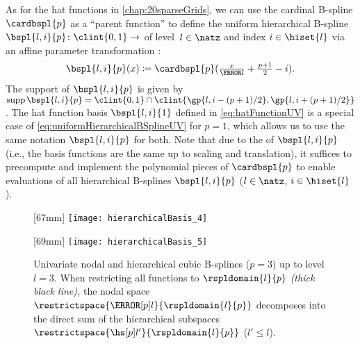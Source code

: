 As for the hat functions in \cref{chap:20sparseGrids},
we can use the cardinal B-spline $\cardbspl{p}$ as a ``parent function'' to
define the uniform hierarchical B-spline
$\bspl{l,i}{p}\colon \clint{0, 1} \to \real$ of level~$l \in \natz$ and index
$i \in \hiset{l}$ via an affine parameter transformation
\cite{Pflueger10Spatially}:
\begin{equation}
  \label{eq:uniformHierarchicalBSplineUV}
  \bspl{l,i}{p}(x)
  \ceq \cardbspl{p}(\tfrac{x}{\ms{l}} + \tfrac{p+1}{2} - i).
\end{equation}
The support of $\bspl{l,i}{p}$ is given
by $\supp \bspl{l,i}{p} = \clint{0, 1} \cap \clint{\gp{l,i-(p+1)/2}, \gp{l,i+(p+1)/2}}$.
The hat function basis $\bspl{l,i}{1}$ defined in
\eqref{eq:hatFunctionUV} is a special case of
\eqref{eq:uniformHierarchicalBSplineUV} for $p = 1$,
which allows us to use the same notation $\bspl{l,i}{p}$ for both.
Note that due to the  of $\bspl{l,i}{p}$
(i.e., the basis functions are the same up to scaling and translation),
it suffices to precompute and implement the polynomial pieces of $\cardbspl{p}$
to enable evaluations of all hierarchical B-splines
$\bspl{l,i}{p}$ ($l \in \natz$, $i \in \hiset{l}$).

\begin{figure}
  [67mm]{%
    \texttt{[image: hierarchicalBasis\_4]}%
  }%
  \hfill%
  \hfill%
  [69mm]{%
    \texttt{[image: hierarchicalBasis\_5]}%
  }%
  \caption[%
    Nodal and hierarchical B-splines%
  ]{%
    Univariate nodal and hierarchical cubic B-splines ($p = 3$)
    \vspace{0.1em}%
    up to level $l = 3$.
    When restricting all functions to $\rspldomain{l}{p}$
    \emph{(thick black line),}
    \vspace{-0.2em}%
    the nodal space $\restrictspace{\nsbspl{l}{p}}{\rspldomain{l}{p}}$
    decomposes into the direct sum of the hierarchical subspaces
    $\restrictspace{\hsbspl{l'}{p}}{\rspldomain{l}{p}}$ ($l' \le l$).%
  }%
  \label{fig:hierarchicalBSpline}%
\end{figure}

